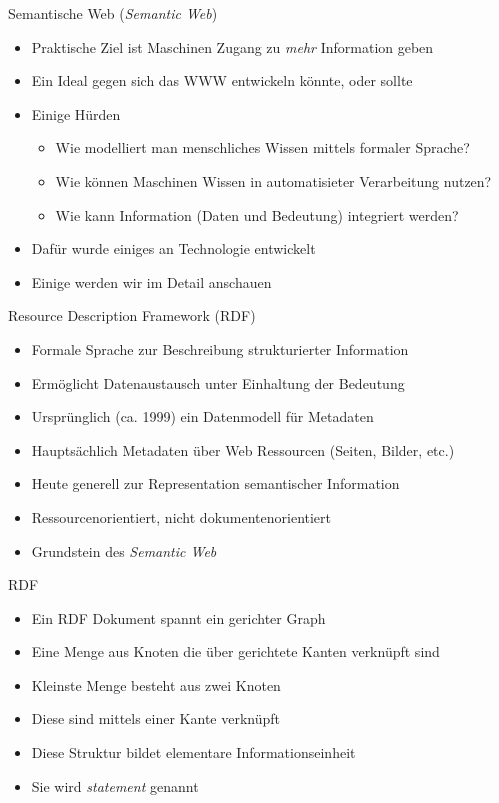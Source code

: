 \documentclass{beamer}
\begin{document}
\begin{frame}{Semantische Web (\emph{Semantic Web})}
	
	\begin{itemize}
		\item Praktische Ziel ist Maschinen Zugang zu \emph{mehr} Information geben
		\item Ein Ideal gegen sich das WWW entwickeln könnte, oder sollte
		\item Einige Hürden
		\begin{itemize}
			\item Wie modelliert man menschliches Wissen mittels formaler Sprache?
			\item Wie können Maschinen Wissen in automatisieter Verarbeitung nutzen?
			\item Wie kann Information (Daten und Bedeutung) integriert werden?
		\end{itemize}
		\item Dafür wurde einiges an Technologie entwickelt
		\item Einige werden wir im Detail anschauen
	\end{itemize}
	
\end{frame}

\begin{frame}{Resource Description Framework (RDF)}
	
	\begin{itemize}
		\item Formale Sprache zur Beschreibung strukturierter Information
		\item Ermöglicht Datenaustausch unter Einhaltung der Bedeutung
		\item Ursprünglich (ca. 1999) ein Datenmodell für Metadaten
		\item Hauptsächlich Metadaten über Web Ressourcen (Seiten, Bilder, etc.)
		\item Heute generell zur Representation semantischer Information
		\item Ressourcenorientiert, nicht dokumentenorientiert
		\item Grundstein des \emph{Semantic Web}
	\end{itemize}
	
\end{frame}

\begin{frame}{RDF}
	
	\begin{itemize}
		\item Ein RDF Dokument spannt ein gerichter Graph
		\item Eine Menge aus Knoten die über gerichtete Kanten verknüpft sind
		\item Kleinste Menge besteht aus zwei Knoten 
		\item Diese sind mittels einer Kante verknüpft
		\item Diese Struktur bildet elementare Informationseinheit
		\item Sie wird \emph{statement} genannt
	\end{itemize}
	
\end{frame}
\end{document}
